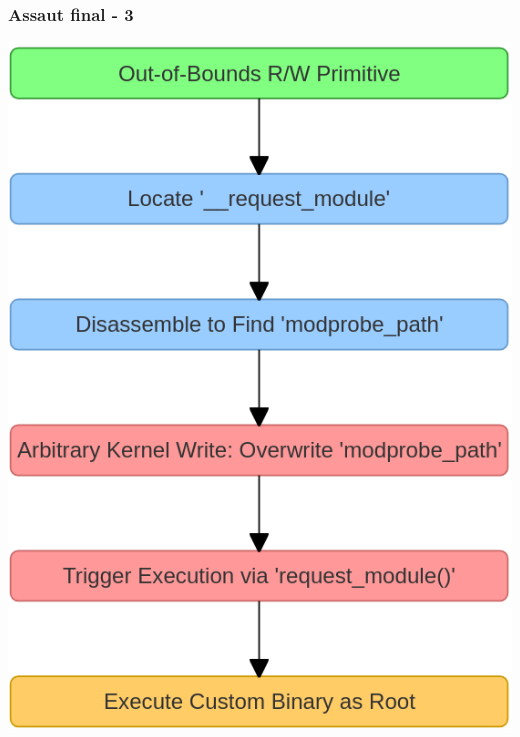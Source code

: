 \documentclass{beamer}
\begin{document}
\begin{frame}
\begin{columns}
\begin{column}{0.5\textwidth}
\begin{center}
            \end{center}
        \end{column}
    \end{columns}
\end{frame}

\begin{frame}
    \frametitle{Assaut final - 3}

        \begin{center}
            \includegraphics[scale=0.28]{exploit/etape3.png}
        \end{center}

\end{frame}






\end{document}
